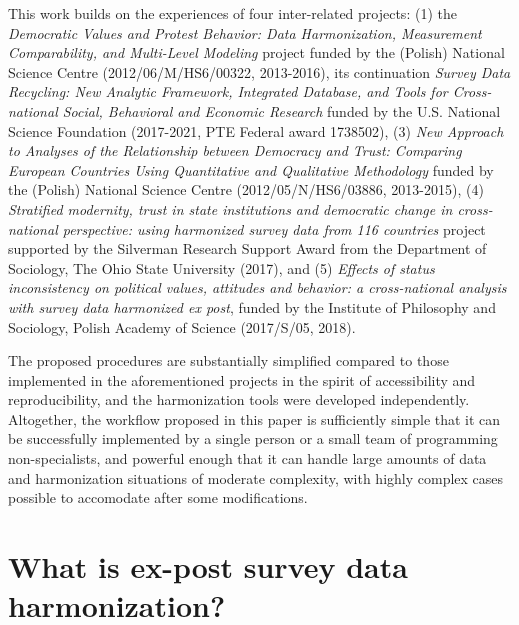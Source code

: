 \documentclass[12pt,]{article}
\begin{document}
This work builds on the experiences of four inter-related projects: (1) the \emph{Democratic Values and Protest Behavior: Data Harmonization, Measurement Comparability, and Multi-Level Modeling} project funded by the (Polish) National Science Centre (2012/06/M/HS6/00322, 2013-2016), its continuation \emph{Survey Data Recycling: New Analytic Framework, Integrated Database, and Tools for Cross-national Social, Behavioral and Economic Research} funded by the U.S. National Science Foundation (2017-2021, PTE Federal award 1738502), (3) \emph{New Approach to Analyses of the Relationship between Democracy and Trust: Comparing European Countries Using Quantitative and Qualitative Methodology} funded by the (Polish) National Science Centre (2012/05/N/HS6/03886, 2013-2015), (4) \emph{Stratified modernity, trust in state institutions and democratic change in cross-national perspective: using harmonized survey data from 116 countries} project supported by the Silverman Research Support Award from the Department of Sociology, The Ohio State University (2017), and (5) \emph{Effects of status inconsistency on political values, attitudes and behavior: a cross-national analysis with survey data harmonized ex post}, funded by the Institute of Philosophy and Sociology, Polish Academy of Science (2017/S/05, 2018).

The proposed procedures are substantially simplified compared to those implemented in the aforementioned projects in the spirit of accessibility and reproducibility, and the harmonization tools were developed independently. Altogether, the workflow proposed in this paper is sufficiently simple that it can be successfully implemented by a single person or a small team of programming non-specialists, and powerful enough that it can handle large amounts of data and harmonization situations of moderate complexity, with highly complex cases possible to accomodate after some modifications.

\hypertarget{what-is-ex-post-survey-data-harmonization}{%
\section{What is ex-post survey data harmonization?}\label{what-is-ex-post-survey-data-harmonization}}
\end{document}
